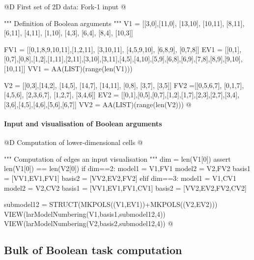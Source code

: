 \documentclass[11pt,oneside]{article}	%
\begin{document}
@D First set of 2D data: Fork-1 input
@{""" Definition of Boolean arguments """
V1 = [[3,0],[11,0], [13,10], [10,11], [8,11], [6,11], [4,11], [1,10], [4,3], [6,4], 
	[8,4], [10,3]]
	
FV1 = [[0,1,8,9,10,11],[1,2,11], [3,10,11], [4,5,9,10], [6,8,9], [0,7,8]]
EV1 = [[0,1],[0,7],[0,8],[1,2],[1,11],[2,11],[3,10],[3,11],[4,5],[4,10],[5,9],[6,8],[6,9],[7,8],[8,9],[9,10],[10,11]]
VV1 = AA(LIST)(range(len(V1)))

V2 = [[0,3],[14,2], [14,5], [14,7], [14,11], [0,8], [3,7], [3,5]]
FV2 =[[0,5,6,7], [0,1,7], [4,5,6], [2,3,6,7], [1,2,7], [3,4,6]]
EV2 = [[0,1],[0,5],[0,7],[1,2],[1,7],[2,3],[2,7],[3,4],[3,6],[4,5],[4,6],[5,6],[6,7]]
VV2 = AA(LIST)(range(len(V2)))
@}


\paragraph{Input and visualisation of Boolean arguments}

@D Computation of lower-dimensional cells
@{""" Computation of edges an input visualisation """
dim = len(V1[0])
assert len(V1[0]) == len(V2[0])
if dim==2:
    model1 = V1,FV1
    model2 = V2,FV2
    basis1 = [VV1,EV1,FV1]
    basis2 = [VV2,EV2,FV2]
elif dim==3:
    model1 = V1,CV1
    model2 = V2,CV2
    basis1 = [VV1,EV1,FV1,CV1]
    basis2 = [VV2,EV2,FV2,CV2]
    
submodel12 = STRUCT(MKPOLS((V1,EV1))+MKPOLS((V2,EV2)))
VIEW(larModelNumbering(V1,basis1,submodel12,4))
VIEW(larModelNumbering(V2,basis2,submodel12,4))
@}

\subsection{Bulk of Boolean task computation}
\end{document}
